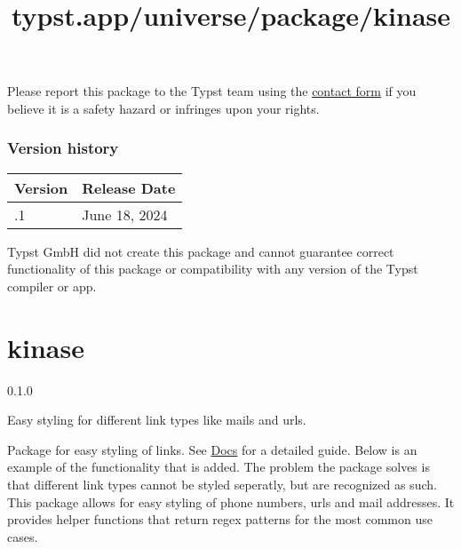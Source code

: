 Please report this package to the Typst team using the
\href{https://typst.app/contact}{contact form} if you believe it is a
safety hazard or infringes upon your rights.

\label{versions}
\subsubsection{Version history}\label{version-history}

\begin{longtable}[]{@{}ll@{}}
\toprule\noalign{}
Version & Release Date \\
\midrule\noalign{}
\endhead
\bottomrule\noalign{}
\endlastfoot
0.0.1 & June 18, 2024 \\
\end{longtable}

Typst GmbH did not create this package and cannot guarantee correct
functionality of this package or compatibility with any version of the
Typst compiler or app.


\title{typst.app/universe/package/kinase}

\label{banner}
\section{kinase}\label{kinase}

{ 0.1.0 }

Easy styling for different link types like mails and urls.

\label{readme}
Package for easy styling of links. See
\href{https://github.com/typst/packages/raw/main/packages/preview/kinase/0.1.0/docs/manual.pdf}{Docs}
for a detailed guide. Below is an example of the functionality that is
added. The problem the package solves is that different link types
cannot be styled seperatly, but are recognized as such. This package
allows for easy styling of phone numbers, urls and mail addresses. It
provides helper functions that return regex patterns for the most common
use cases.

